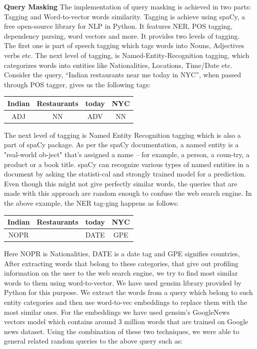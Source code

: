 \documentclass[10pt, a4paper, twocolumn]{article} %
\begin{document}
\textbf{Query Masking}\newline
The implementation of query masking is achieved in two parts: Tagging and Word-to-vector words similarity. Tagging is achieve using spaCy, a free open-source library for NLP in Python. It features NER, POS tagging, dependency parsing, word vectors and more. It provides two levels of tagging. The first one is part of speech tagging which tags words into Nouns, Adjectives verbs etc. The next level of tagging, is Named-Entity-Recognition tagging, which categorizes words into entities like Nationalities, Locations, Time/Date etc. Consider the query, “Indian restaurants near me today in NYC”, when passed through POS tagger, gives us the following tags:
\begin{center}
\begin{tabular}{ |c|c|c|c| } 
 \hline
 Indian & Restaurants & today & NYC \\ 
 \hline
 ADJ & NN & ADV & NN \\ 
 \hline
\end{tabular}
\end{center}
The next level of tagging is Named Entity Recognition tagging which is also a part of spaCy package. As per the spaCy documentation, a named entity is a "real-world ob-ject" that's assigned a name – for example, a person, a coun-try, a product or a book title. spaCy can recognize various types of named entities in a document by asking the statisti-cal and strongly trained model for a prediction. Even though this might not give perfectly similar words, the queries that are made with this approach are random enough to confuse the web search engine. In the above example, the NER tag-ging happens as follows:
\begin{center}
\begin{tabular}{ |c|c|c|c| } 
 \hline
 Indian & Restaurants & today & NYC \\ 
 \hline
 NOPR &  & DATE & GPE \\ 
 \hline
\end{tabular}
\end{center}
Here NOPR is Nationalities, DATE is a date tag and GPE signifies countries, After extracting words that belong to these categories, that give out profiling information on the user to the web search engine, we try to find most similar words to them using word-to-vector. We have used gensim library provided by Python for this purpose. We extract the words from a query which belong to such entity categories and then use word-to-vec embeddings to replace them with the most similar ones. For the embeddings we have used gensim’s GoogleNews vectors model which contains around 3 million words that are trained on Google news dataset. Using the combination of these two techniques, we were able to general related random queries to the above query such as:\newline
\end{document}
